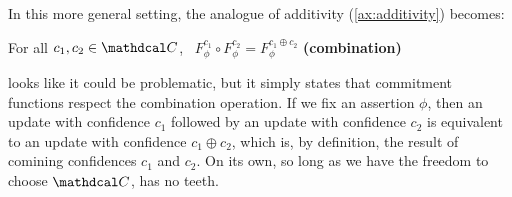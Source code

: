 \documentclass{article}
\def\cofunc{commitment function}
\def\confdom{\mathdcal C}
\begin{document}
In this more general setting, the analogue of additivity (\cref{ax:additivity}) becomes:
\begin{CFaxioms}
	\item For all $c_1, c_2 \in \confdom$,~
		$F^{c_1}_\phi \circ F^{c_2}_\phi = F^{c_1 \oplus c_2}_\phi$
		\hfill \textbf{(combination)} \label{ax:additivity}
\end{CFaxioms}
 looks like it could be problematic, but it simply states that \cofunc s respect the combination operation. 
If we fix an assertion $\phi$, then an update with confidence $c_1$ followed by an update with confidence $c_2$ is equivalent to an update with confidence $c_1 \oplus c_2$, which is, by definition, the result of comining confidences $c_1$ and $c_2$.
On its own, so long as we have the freedom to choose $\confdom$,  has no teeth. 
\end{document}

